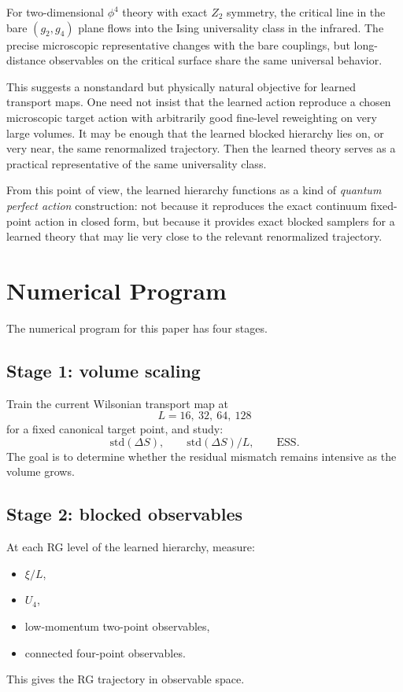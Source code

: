 \documentclass[aps,prd,reprint,nofootinbib,superscriptaddress,longbibliography]{revtex4-2}
\newcommand{\std}{\mathrm{std}}
\newcommand{\ESS}{\mathrm{ESS}}
\begin{document}
For two-dimensional $\phi^4$ theory with exact $Z_2$ symmetry, the critical line
in the bare $(g_2,g_4)$ plane flows into the Ising universality class in the
infrared. The precise microscopic representative changes with the bare couplings,
but long-distance observables on the critical surface share the same universal
behavior.

This suggests a nonstandard but physically natural objective for learned
transport maps. One need not insist that the learned action reproduce a chosen
microscopic target action with arbitrarily good fine-level reweighting on very
large volumes. It may be enough that the learned blocked hierarchy lies on, or
very near, the same renormalized trajectory. Then the learned theory serves as a
practical representative of the same universality class.

From this point of view, the learned hierarchy functions as a kind of
\emph{quantum perfect action} construction: not because it reproduces the exact
continuum fixed-point action in closed form, but because it provides exact
blocked samplers for a learned theory that may lie very close to the relevant
renormalized trajectory.

\section{Numerical Program}
\label{sec:numerical_program}

The numerical program for this paper has four stages.

\subsection{Stage 1: volume scaling}

Train the current Wilsonian transport map at
\begin{equation}
L=16,\ 32,\ 64,\ 128
\end{equation}
for a fixed canonical target point, and study:
\begin{equation}
\std(\Delta S),\qquad \std(\Delta S)/L,\qquad \ESS.
\end{equation}
The goal is to determine whether the residual mismatch remains intensive as the
volume grows.

\subsection{Stage 2: blocked observables}

At each RG level of the learned hierarchy, measure:
\begin{itemize}
\item $\xi/L$,
\item $U_4$,
\item low-momentum two-point observables,
\item connected four-point observables.
\end{itemize}
This gives the RG trajectory in observable space.
\end{document}
